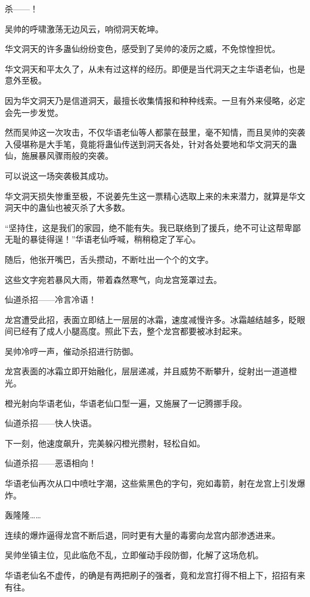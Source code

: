 
\begin{this_body}

杀——！

吴帅的呼啸激荡无边风云，响彻洞天乾坤。

华文洞天的许多蛊仙纷纷变色，感受到了吴帅的凌厉之威，不免惊惶担忧。

华文洞天和平太久了，从未有过这样的经历。即便是当代洞天之主华语老仙，也是意外至极。

因为华文洞天乃是信道洞天，最擅长收集情报和种种线索。一旦有外来侵略，必定会先一步发觉。

然而吴帅这一次攻击，不仅华语老仙等人都蒙在鼓里，毫不知情，而且吴帅的突袭入侵堪称是大手笔，竟能将蛊仙传送到洞天各处，针对各处要地和华文洞天的蛊仙，施展暴风骤雨般的突袭。

可以说这一场突袭极其成功。

华文洞天损失惨重至极，不说姜先生这一票精心选取上来的未来潜力，就算是华文洞天中的蛊仙也被灭杀了大多数。

“坚持住，这是我们的家园，绝不能有失。我已联络到了援兵，绝不可让这帮卑鄙无耻的暴徒得逞！”华语老仙呼喊，稍稍稳定了军心。

随后，他张开嘴巴，舌头攒动，不断吐出一个个的文字。

这些文字宛若暴风大雨，带着森然寒气，向龙宫笼罩过去。

仙道杀招——冷言冷语！

龙宫遭受此招，表面立即结上一层层的冰霜，速度减慢许多。冰霜越结越多，眨眼间已经有了成人小腿高度。照此下去，整个龙宫都要被冰封起来。

吴帅冷哼一声，催动杀招进行防御。

龙宫表面的冰霜立即开始融化，层层递减，并且威势不断攀升，绽射出一道道橙光。

橙光射向华语老仙，华语老仙口型一遍，又施展了一记腾挪手段。

仙道杀招——快人快语。

下一刻，他速度飙升，完美躲闪橙光攒射，轻松自如。

仙道杀招——恶语相向！

华语老仙再次从口中喷吐字潮，这些紫黑色的字句，宛如毒箭，射在龙宫上引发爆炸。

轰隆隆……

连续的爆炸逼得龙宫不断后退，同时更有大量的毒雾向龙宫内部渗透进来。

吴帅坐镇主位，见此临危不乱，立即催动手段防御，化解了这场危机。

华语老仙名不虚传，的确是有两把刷子的强者，竟和龙宫打得不相上下，招招有来有往。


\end{this_body}
